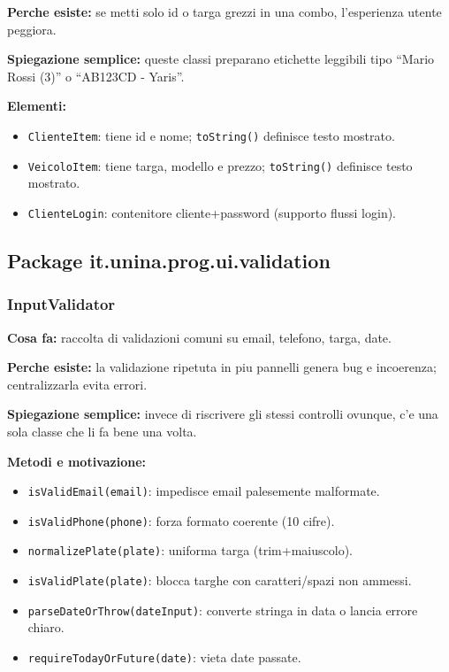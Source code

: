 \documentclass[12pt,a4paper]{article}
\begin{document}
\textbf{Perche esiste:}
se metti solo id o targa grezzi in una combo, l'esperienza utente peggiora.

\textbf{Spiegazione semplice:}
queste classi preparano etichette leggibili tipo ``Mario Rossi (3)'' o ``AB123CD - Yaris''.

\textbf{Elementi:}
\begin{itemize}
  \item \texttt{ClienteItem}: tiene id e nome; \texttt{toString()} definisce testo mostrato.
  \item \texttt{VeicoloItem}: tiene targa, modello e prezzo; \texttt{toString()} definisce testo mostrato.
  \item \texttt{ClienteLogin}: contenitore cliente+password (supporto flussi login).
\end{itemize}

\subsection{Package it.unina.prog.ui.validation}

\subsubsection*{InputValidator}
\textbf{Cosa fa:}
raccolta di validazioni comuni su email, telefono, targa, date.

\textbf{Perche esiste:}
la validazione ripetuta in piu pannelli genera bug e incoerenza; centralizzarla evita errori.

\textbf{Spiegazione semplice:}
invece di riscrivere gli stessi controlli ovunque, c'e una sola classe che li fa bene una volta.

\textbf{Metodi e motivazione:}
\begin{itemize}
  \item \texttt{isValidEmail(email)}: impedisce email palesemente malformate.
  \item \texttt{isValidPhone(phone)}: forza formato coerente (10 cifre).
  \item \texttt{normalizePlate(plate)}: uniforma targa (trim+maiuscolo).
  \item \texttt{isValidPlate(plate)}: blocca targhe con caratteri/spazi non ammessi.
  \item \texttt{parseDateOrThrow(dateInput)}: converte stringa in data o lancia errore chiaro.
  \item \texttt{requireTodayOrFuture(date)}: vieta date passate.
\end{itemize}
\end{document}
